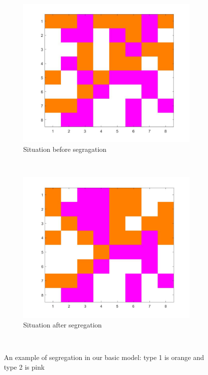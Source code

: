 \begin{figure}[H]
	\centering
    \begin{subfigure}{0.45\textwidth}
        \includegraphics[width=\textwidth]{vb1beginbord.jpg}
        \caption{Situation before segragation}
        \label{fig:ebmb}
    \end{subfigure}\hspace{0cm}
    ~ 
    \begin{subfigure}{0.45\textwidth}
        \includegraphics[width=\textwidth]{vb1eindbord.jpg}
        \caption{Situation after segregation}
        \label{fig:ebme}
    \end{subfigure}
    ~ 
    \caption{An example of segregation in our basic model: type 1 is orange and type 2 is pink}
    \label{fig:example basic model}
\end{figure}

